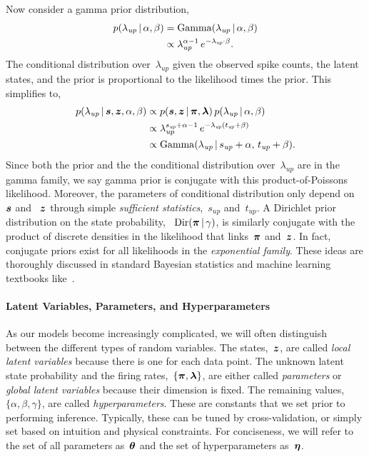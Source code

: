 Now consider a gamma prior distribution,
\begin{align*}
  p(\lambda_{\textit{up}} \,|\, \alpha, \beta)
  &= \mathrm{Gamma}(\lambda_{\textit{up}} \,|\, \alpha, \beta) \\
  &\propto \lambda_{\textit{up}}^{\alpha - 1} \,
  e^{-\lambda_{\textit{up}} \cdot \beta}.
\end{align*}
The conditional distribution over~$\lambda_{\textit{up}}$ given the
observed spike counts, the latent states, and the prior is
proportional to the likelihood times the prior. This simplifies to,
\begin{align*}
  p(\lambda_{\textit{up}} \,|\, \boldsymbol{s}, \boldsymbol{z}, \alpha, \beta)
  &\propto p(\boldsymbol{s}, \boldsymbol{z} \,|\, \boldsymbol{\pi}, \boldsymbol{\lambda}) \,
  p(\lambda_{\textit{up}} \,|\, \alpha, \beta) \\
  &\propto \lambda_{\textit{up}}^{s_{\textit{up}} + \alpha - 1} \,
  e^{-\lambda_{\textit{up}} (t_{\textit{up}} +\beta)} \\
  &\propto \mathrm{Gamma}(\lambda_{\textit{up}} \,|\,
  s_{\textit{up}} + \alpha, \,
  t_{\textit{up}} + \beta).
\end{align*}
Since both the prior and the the conditional distribution
over~$\lambda_{\textit{up}}$ are in the gamma family, we say gamma
prior is conjugate with this product-of-Poissons likelihood.
Moreover, the parameters of conditional distribution only depend
on~$\boldsymbol{s}$ and ~$\boldsymbol{z}$ through simple \emph{sufficient
  statistics},~$s_{\textit{up}}$ and~$t_{\textit{up}}$. A Dirichlet
prior distribution on the state probability, ~${\mathrm{Dir}(\boldsymbol{\pi}
  \,|\, \gamma)}$, is similarly conjugate with the
product of discrete densities in the likelihood that links~$\boldsymbol{\pi}$ and~$\boldsymbol{z}$.  In
fact, conjugate priors exist for all likelihoods in the
\emph{exponential family}. These ideas are thoroughly discussed in
standard Bayesian statistics and machine learning textbooks
like~\citet{Gelman13, murphy2012probabilistic}.


\paragraph{Latent Variables, Parameters, and Hyperparameters}
As our models become increasingly complicated, we will often distinguish
between the different types of random variables. The states,~$\boldsymbol{z}$,
are called \emph{local latent variables} because there is one for each
data point.  The unknown latent state probability and the
firing rates,~${ \{\boldsymbol{\pi}, \boldsymbol{\lambda}\} }$, are either called \emph{parameters} or
\emph{global latent variables} because their dimension is fixed. The
remaining values,~${\{ \alpha, \beta, \gamma \} }$,
are called \emph{hyperparameters}. These are constants that we set
prior to performing inference.  Typically, these can be tuned by
cross-validation, or simply set based on intuition and physical
constraints. For conciseness, we will refer to the set of
all parameters as~$\boldsymbol{\theta}$ and the set of hyperparameters
as~$\boldsymbol{\eta}$.


